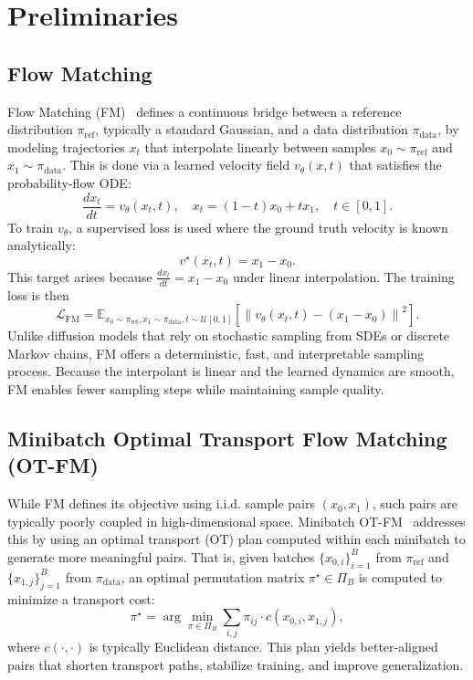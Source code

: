 \documentclass{article}
\begin{document}
\section{Preliminaries}
\label{sec:preliminaries}

\subsection{Flow Matching}

Flow Matching (FM)~\cite{lipman2023fm} defines a continuous bridge between a reference distribution \(\pi_{\mathrm{ref}}\), typically a standard Gaussian, and a data distribution \(\pi_{\mathrm{data}}\), by modeling trajectories \(x_t\) that interpolate linearly between samples \(x_0 \sim \pi_{\mathrm{ref}}\) and \(x_1 \sim \pi_{\mathrm{data}}\). This is done via a learned velocity field \(v_\theta(x, t)\) that satisfies the probability-flow ODE:
\[
\frac{dx_t}{dt} = v_\theta(x_t, t), \quad x_t = (1 - t)x_0 + t x_1, \quad t \in [0,1].
\]
To train \(v_\theta\), a supervised loss is used where the ground truth velocity is known analytically:
\[
v^\star(x_t, t) = x_1 - x_0.
\]
This target arises because \(\frac{dx_t}{dt} = x_1 - x_0\) under linear interpolation. The training loss is then
\[
\mathcal{L}_{\mathrm{FM}} = \mathbb{E}_{x_0 \sim \pi_{\mathrm{ref}}, x_1 \sim \pi_{\mathrm{data}}, t \sim \mathcal{U}[0,1]} \left[ \left\| v_\theta(x_t, t) - (x_1 - x_0) \right\|^2 \right].
\]
Unlike diffusion models that rely on stochastic sampling from SDEs or discrete Markov chains, FM offers a deterministic, fast, and interpretable sampling process. Because the interpolant is linear and the learned dynamics are smooth, FM enables fewer sampling steps while maintaining sample quality.

\subsection{Minibatch Optimal Transport Flow Matching (OT-FM)}

While FM defines its objective using i.i.d. sample pairs \((x_0, x_1)\), such pairs are typically poorly coupled in high-dimensional space. Minibatch OT-FM~\cite{tong2024otfm} addresses this by using an optimal transport (OT) plan computed within each minibatch to generate more meaningful pairs. That is, given batches \(\{x_{0,i}\}_{i=1}^B\) from \(\pi_{\mathrm{ref}}\) and \(\{x_{1,j}\}_{j=1}^B\) from \(\pi_{\mathrm{data}}\), an optimal permutation matrix \(\pi^\star \in \Pi_B\) is computed to minimize a transport cost:
\[
\pi^\star = \arg\min_{\pi \in \Pi_B} \sum_{i,j} \pi_{ij} \cdot c(x_{0,i}, x_{1,j}),
\]
where \(c(\cdot, \cdot)\) is typically Euclidean distance. This plan yields better-aligned pairs that shorten transport paths, stabilize training, and improve generalization.
\end{document}
